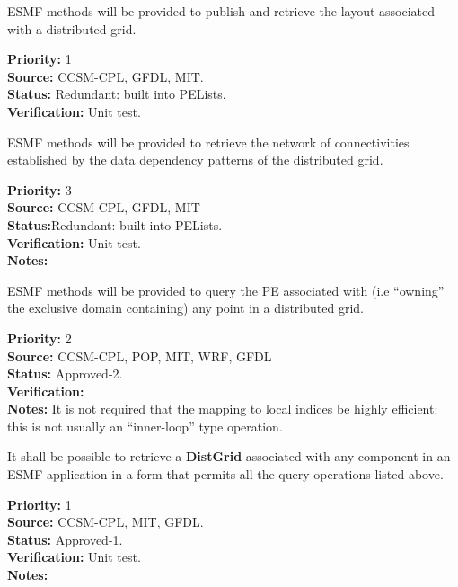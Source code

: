 
ESMF methods will be provided to publish and retrieve the layout
associated with a distributed grid.

\begin{reqlist}
{\bf Priority:} 1 \\
{\bf Source:} CCSM-CPL, GFDL, MIT. \\
{\bf Status:} Redundant: built into PELists. \\
{\bf Verification:} Unit test.
\end{reqlist}


ESMF methods will be provided to retrieve the network of
connectivities established by the data dependency patterns of the
distributed grid.

\begin{reqlist}
{\bf Priority:} 3 \\
{\bf Source:} CCSM-CPL, GFDL, MIT \\
{\bf Status:}Redundant: built into PELists.  \\
{\bf Verification:} Unit test.\\
{\bf Notes:}
\end{reqlist}


ESMF methods will be provided to query the PE associated with (i.e
``owning'' the exclusive domain containing) any point in a
distributed grid.

\begin{reqlist}
{\bf Priority:} 2 \\ 
{\bf Source:} CCSM-CPL, POP, MIT, WRF, GFDL \\
{\bf Status:} Approved-2. \\
{\bf Verification:} \\
{\bf Notes:} It is not required that the mapping to local indices be
highly efficient: this is not usually an ``inner-loop'' type operation.
\end{reqlist}


It shall be possible to retrieve a \textbf{DistGrid} associated with
any component in an ESMF application in a form that permits all the query
operations listed above.

\begin{reqlist}
{\bf Priority:} 1 \\
{\bf Source:} CCSM-CPL, MIT, GFDL. \\
{\bf Status:} Approved-1. \\
{\bf Verification:} Unit test. \\
{\bf Notes:}
\end{reqlist}

